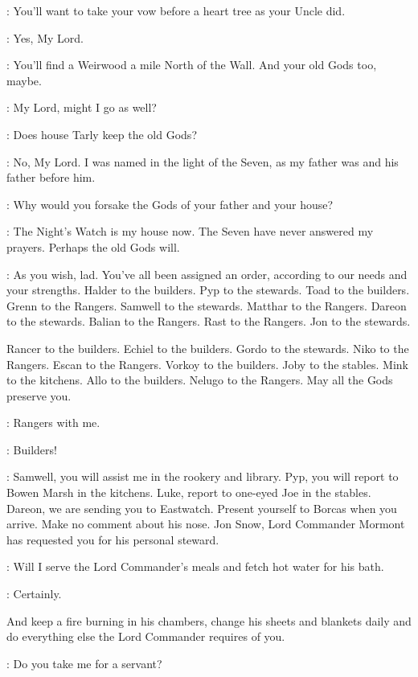 \JEOR: You'll want to take your vow before a heart tree as your Uncle did. 

\JON: Yes, My Lord. 

\JEOR: You'll find a Weirwood a mile North of the Wall.  And your old Gods too, maybe. 

\SAM: My Lord, might I go as well? 

\JEOR: Does house Tarly keep the old Gods? 

\SAM: No, My Lord.  I was named in the light of the Seven, as my father was and his father before him. 

\JEOR: Why would you forsake the Gods of your father and your house? 

\SAM: The Night's Watch is my house now. The Seven have never answered my prayers. Perhaps the old Gods will. 

\JEOR: As you wish, lad.  You've all been assigned an order, according to our needs and your strengths.  Halder to the builders. Pyp to the stewards. Toad to the builders. Grenn to the Rangers. Samwell to the stewards. Matthar to the Rangers. Dareon to the stewards. Balian to the Rangers. Rast to the Rangers. Jon to the stewards. 

 Rancer to the builders. Echiel to the builders. Gordo to the stewards. Niko to the Rangers. Escan to the Rangers. Vorkoy to the builders. Joby to the stables. Mink to the kitchens. Allo to the builders. Nelugo to the Rangers. May all the Gods preserve you. 

\WATCHMANa: Rangers with me. 

\WATCHMANb: Builders! 

\AEMON: Samwell, you will assist me in the rookery and library. Pyp, you will report to Bowen Marsh in the kitchens. Luke, report to one-eyed Joe in the stables. Dareon, we are sending you to Eastwatch. Present yourself to Borcas when you arrive. Make no comment about his nose. Jon Snow, Lord Commander Mormont has requested you for his personal steward. 

\JON:  Will I serve the Lord Commander's meals and fetch hot water for his bath. 

\AEMON: Certainly. 

And keep a fire burning in his chambers, change his sheets and blankets daily and do everything else the Lord Commander requires of you. 

\JON:  Do you take me for a servant? 

